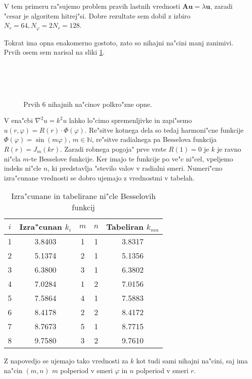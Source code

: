 \documentclass[a4paper,10pt]{article}
\renewcommand{\vec}{\mathbf}
\renewcommand{\phi}{\varphi}
\begin{document}
V tem primeru ra"sujemo problem pravih lastnih vrednosti $\vec A\vec u = \lambda \vec u$, zaradi "cesar je algoritem hitrej"si. Dobre rezultate sem dobil z izbiro $N_r = 64, N_\phi = 2N_r = 128$. 

Tokrat ima opna enakomerno gostoto, zato so nihajni na"cini manj zanimivi. Prvih osem sem narisal na sliki \ref{fig:polkrog}. 

\begin{figure}[H]
\centering
   \\
   \\
   \\
\caption{Prvih 6 nihajnih na"cinov polkro"zne opne.}
\label{fig:polkrog}
\end{figure}

V ena"cbi $\nabla^2 u = k^2 u$ lahko lo"cimo spremenljivke in zapi"semo $u(r,\phi) = R(r) \cdot \Phi(\phi)$. Re"sitve kotnega dela so tedaj harmoni"cne funkcije $\Phi(\phi) = \sin(m\phi)$, $m\in\mathbb{N}$, re"sitve radialnega pa Besselova funkcija $R(r) = J_m(kr)$. Zaradi robnega pogoja" prve vrste $R(1) = 0$ je $k$ je ravno ni"cla $m$-te Besselove funkcije. Ker imajo te funkcije po ve"c ni"cel, vpeljemo indeks ni"cle $n$, ki predstavlja "stevilo valov v radialni smeri. Numeri"cno izra"cunane vrednosti se dobro ujemajo z vrednostmi v tabelah. 

\begin{table}[H]
\centering
\begin{tabular}{|c|c|c|c|c|}
\hline
  $i$ & Izra"cunan $k_i$ & $m$ & $n$ & Tabeliran $k_{mn}$ \\
\hline
  1 & 3.8403 & 1 & 1 & 3.8317 \\
  2 & 5.1374 & 2 & 1 & 5.1356 \\
  3 & 6.3800 & 3 & 1 & 6.3802 \\
  4 & 7.0284 & 1 & 2 & 7.0156 \\
  5 & 7.5864 & 4 & 1 & 7.5883 \\
  6 & 8.4178 & 2 & 2 & 8.4172 \\
  7 & 8.7673 & 5 & 1 & 8.7715 \\
  8 & 9.7580 & 3 & 2 & 9.7610 \\
\hline
\end{tabular}
  \caption{Izra"cunane in tabelirane ni"cle Besselovih funkcij}
\end{table}

Z napovedjo se ujemajo tako vrednosti za $k$ kot tudi sami nihajni na"cini, saj ima na"cin $(m,n)$ $m$ polperiod v smeri $\phi$ in $n$ polperiod v smeri $r$. 
\end{document}
